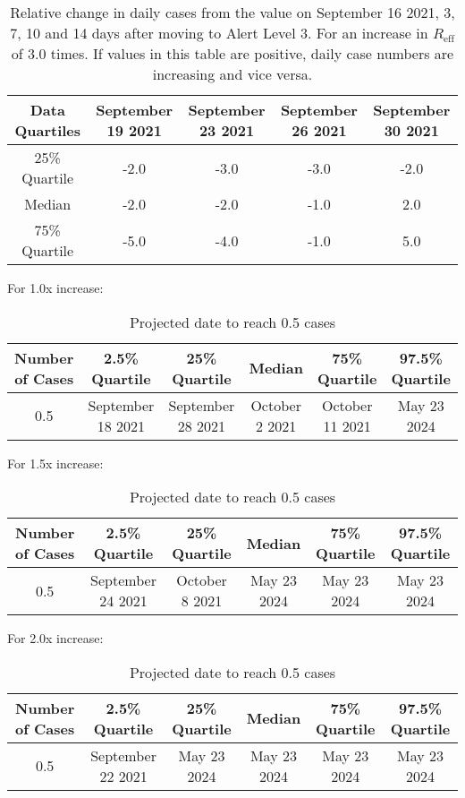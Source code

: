 \begin{table}[h] 
 \centering 
 \begin{tabular}{c|c|c|c|c}
Data Quartiles & September 19 2021 & September 23 2021 & September 26 2021 & September 30 2021\\
\hline
25\% Quartile & -2.0 & -3.0 & -3.0 & -2.0\\
Median & -2.0 & -2.0 & -1.0 & 2.0\\
75\% Quartile & -5.0 & -4.0 & -1.0 & 5.0\\
\end{tabular}
\caption{Relative change in daily cases from the value on September 16 2021, 3, 7, 10 and 14 days after moving to Alert Level 3. For an increase in $R_\text{eff}$ of 3.0 times. If values in this table are positive, daily case numbers are increasing and vice versa.}
\label{tab:BP_predicted_cases_3.0}
\end{table}

For 1.0x increase:

\begin{table}[h] 
 \centering 
 \begin{tabular}{c|c|c|c|c|c}
Number of Cases & 2.5\% Quartile & 25\% Quartile & Median & 75\% Quartile & 97.5\% Quartile \\
\hline
0.5 & September 18 2021 & September 28 2021 & October 2 2021 & October 11 2021 & May 23 2024\\
\end{tabular}
\caption{Projected date to reach 0.5 cases}
\label{tab:BP_date_to_reach_cases}
\end{table}

For 1.5x increase:

\begin{table}[h] 
 \centering 
 \begin{tabular}{c|c|c|c|c|c}
Number of Cases & 2.5\% Quartile & 25\% Quartile & Median & 75\% Quartile & 97.5\% Quartile \\
\hline
0.5 & September 24 2021 & October 8 2021 & May 23 2024 & May 23 2024 & May 23 2024\\
\end{tabular}
\caption{Projected date to reach 0.5 cases}
\label{tab:BP_date_to_reach_cases}
\end{table}

For 2.0x increase:

\begin{table}[h] 
 \centering 
 \begin{tabular}{c|c|c|c|c|c}
Number of Cases & 2.5\% Quartile & 25\% Quartile & Median & 75\% Quartile & 97.5\% Quartile \\
\hline
0.5 & September 22 2021 & May 23 2024 & May 23 2024 & May 23 2024 & May 23 2024\\
\end{tabular}
\caption{Projected date to reach 0.5 cases}
\label{tab:BP_date_to_reach_cases}
\end{table}

